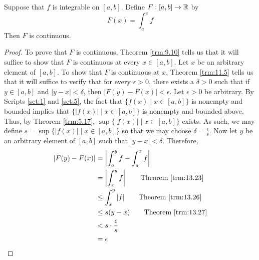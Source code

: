 \documentclass[../main.tex]{subfiles}
\begin{document}
\begin{theorem}\label{trm:13.28}
    Suppose that $f$ is integrable on $[a,b]$. Define $F:[a,b]\to\mathbb{R}$ by
    \begin{equation*}
        F(x) = \int_a^xf
    \end{equation*}
    Then $F$ is continuous.
    \begin{proof}
        To prove that $F$ is continuous, Theorem \ref{trm:9.10} tells us that it will suffice to show that $F$ is continuous at every $x\in[a,b]$. Let $x$ be an arbitrary element of $[a,b]$. To show that $F$ is continuous at $x$, Theorem \ref{trm:11.5} tells us that it will suffice to verify that for every $\epsilon>0$, there exists a $\delta>0$ such that if $y\in[a,b]$ and $|y-x|<\delta$, then $|F(y)-F(x)|<\epsilon$. Let $\epsilon>0$ be arbitrary. By Scripts \ref{sct:1} and \ref{sct:5}, the fact that $\{f(x)\mid x\in[a,b]\}$ is nonempty and bounded implies that $\{|f(x)|\mid x\in[a,b]\}$ is nonempty and bounded above. Thus, by Theorem \ref{trm:5.17}, $\sup\{|f(x)|\mid x\in[a,b]\}$ exists. As such, we may define $s=\sup\{|f(x)|\mid x\in[a,b]\}$ so that we may choose $\delta=\frac{\epsilon}{s}$. Now let $y$ be an arbitrary element of $[a,b]$ such that $|y-x|<\delta$. Therefore,
        \begin{align*}
            |F(y)-F(x)| &= \left| \int_a^yf-\int_a^xf \right|\\
            &= \left| \int_x^yf \right|\tag*{Theorem \ref{trm:13.23}}\\
            &\leq \int_x^y|f|\tag*{Theorem \ref{trm:13.26}}\\
            &\leq s(y-x)\tag*{Theorem \ref{trm:13.27}}\\
            &< s\cdot\frac{\epsilon}{s}\\
            &= \epsilon
        \end{align*}
    \end{proof}
\end{theorem}
\end{document}
